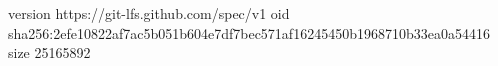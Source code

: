 version https://git-lfs.github.com/spec/v1
oid sha256:2efe10822af7ac5b051b604e7df7bec571af16245450b1968710b33ea0a54416
size 25165892
